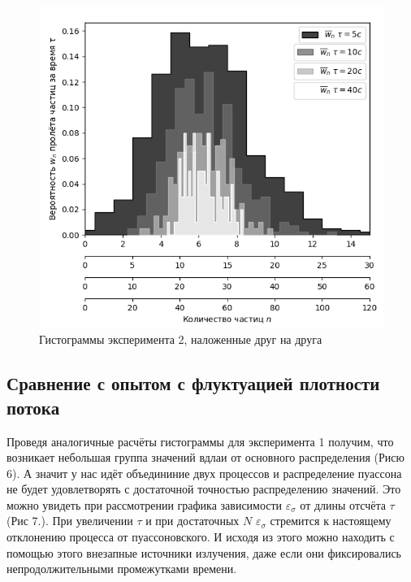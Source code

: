 \documentclass[12pt,a4paper]{article}
\begin{document}
\begin{figure}[!ht]
\includegraphics[width=1\textwidth]{imgs/allhist.png}
\caption{Гистограммы эксперимента 2, наложенные друг на друга}
\end{figure}

\clearpage

\subsection{Сравнение с опытом с флуктуацией плотности потока}
Проведя аналогичные расчёты гистограммы для эксперимента 1 получим, что возникает небольшая группа значений вдлаи от основного распределения (Рисю 6). А значит у нас идёт объедининие двух процессов и распределение пуассона не будет удовлетворять с достаточной точностью распределению значений. Это можно увидеть при рассмотрении графика зависимости $\varepsilon_{\sigma}$ от длины отсчёта $\tau$ (Рис 7.). При увеличении $\tau$ и при достаточных $N$ $\varepsilon_{\sigma}$ стремится к настоящему отклонению процесса от пуассоновского. И исходя из этого можно находить с помощью этого внезапные источники излучения, даже если они фиксировались непродолжительными промежутками времени.
\end{document}
